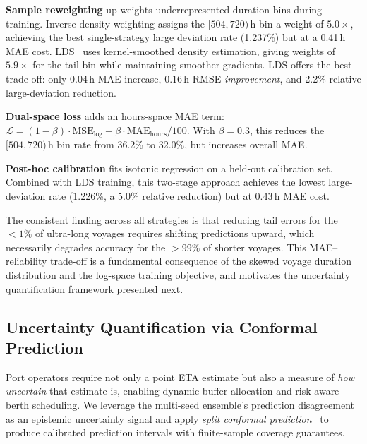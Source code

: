 \documentclass[conference]{IEEEtran}
\begin{document}
\textbf{Sample reweighting} up-weights underrepresented duration bins during training.
Inverse-density weighting assigns the $[504, 720)$\,h bin a weight of $5.0\times$, achieving the best single-strategy large deviation rate (1.237\%) but at a 0.41\,h MAE cost.
LDS~\cite{yang2021lds} uses kernel-smoothed density estimation, giving weights of $5.9\times$ for the tail bin while maintaining smoother gradients.
LDS offers the best trade-off: only 0.04\,h MAE increase, 0.16\,h RMSE \textit{improvement}, and 2.2\% relative large-deviation reduction.

\textbf{Dual-space loss} adds an hours-space MAE term:
$\mathcal{L} = (1{-}\beta) \cdot \text{MSE}_{\text{log}} + \beta \cdot \text{MAE}_{\text{hours}} / 100$.
With $\beta = 0.3$, this reduces the $[504, 720)$\,h bin rate from 36.2\% to 32.0\%, but increases overall MAE.

\textbf{Post-hoc calibration} fits isotonic regression on a held-out calibration set.
Combined with LDS training, this two-stage approach achieves the lowest large-deviation rate (1.226\%, a 5.0\% relative reduction) but at 0.43\,h MAE cost.

The consistent finding across all strategies is that reducing tail errors for the $< 1\%$ of ultra-long voyages requires shifting predictions upward, which necessarily degrades accuracy for the $> 99\%$ of shorter voyages.
This MAE--reliability trade-off is a fundamental consequence of the skewed voyage duration distribution and the log-space training objective, and motivates the uncertainty quantification framework presented next.

\subsection{Uncertainty Quantification via Conformal Prediction}
\label{sec:uq}

Port operators require not only a point ETA estimate but also a measure of \textit{how uncertain} that estimate is, enabling dynamic buffer allocation and risk-aware berth scheduling.
We leverage the multi-seed ensemble's prediction disagreement as an epistemic uncertainty signal and apply \textit{split conformal prediction}~\cite{vovk2005conformal,romano2019cqr} to produce calibrated prediction intervals with finite-sample coverage guarantees.
\end{document}
